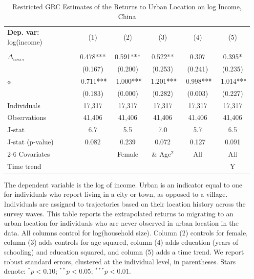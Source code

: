 \begin{table}[htbp] \centering \begin{threeparttable}
 \caption{Restricted GRC Estimates of the Returns to Urban Location on log Income, China} 
 \label{tab:GRC_CHN_income_urban_unb} 
\begin{tabular}{l ccccc} \toprule  \textbf{Dep. var:}  log(income) 
                    &\multicolumn{1}{c}{(1)}   &\multicolumn{1}{c}{(2)}   &\multicolumn{1}{c}{(3)}   &\multicolumn{1}{c}{(4)}   &\multicolumn{1}{c}{(5)}   \\
                    &               &               &               &               &               \\
\addlinespace
$\Delta_{\text{never}}$&    0.478***&       0.591***&       0.522** &       0.307   &       0.395*  \\
                    &     (0.167)   &     (0.200)   &     (0.253)   &     (0.241)   &     (0.235)   \\
\addlinespace
$\phi$              &      -0.711***&      -1.000***&      -1.201***&      -0.998***&      -1.014***\\
                    &     (0.183)   &     (0.000)   &     (0.282)   &     (0.003)   &     (0.227)   \\
\addlinespace
Individuals         &      17,317   &      17,317   &      17,317   &      17,317   &      17,317   \\
Observations        &      41,406   &      41,406   &      41,406   &      41,406   &      41,406   \\
J-stat              &         6.7   &         5.5   &         7.0   &         5.7   &         6.5   \\
J-stat (p-value)    &       0.082   &       0.239   &       0.072   &       0.127   &       0.091   \\
\cmidrule{2-6} Covariates & & Female & \& Age$^2$ & All & All  \\ Time trend & & & & & Y \\ \bottomrule \end{tabular} \begin{tablenotes} \footnotesize \item{The dependent variable is the log of income. Urban is an indicator equal to one for individuals who report living in a city or town, as opposed to a village. Individuals are assigned to trajectories based on their location history across the survey waves. This table reports the extrapolated returns to migrating to an urban location for individuals who are never observed in urban location in the data. 
All columns control for log(household size). Column (2) controls for female, column (3) adds controls for age squared, column (4) adds education (years of schooling) and education squared, and column (5) adds a time trend.  We report robust standard errors, clustered at the individual level, in parentheses. Stars denote: $^{*} p<0.10$; $^{**} p<0.05$; $^{***} p<0.01$.} \end{tablenotes} \end{threeparttable} \end{table}
